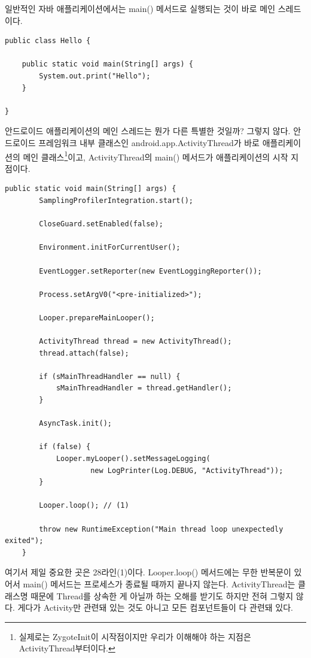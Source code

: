 일반적인 자바 애플리케이션에서는 main() 메서드로 실행되는 것이 바로 메인 스레드이다.
\begin{lstlisting}[frame=single] 
public class Hello {

	public static void main(String[] args) {
		System.out.print("Hello");
	}

}
\end{lstlisting}

안드로이드 애플리케이션의 메인 스레드는 뭔가 다른 특별한 것일까? 그렇지 않다. 
안드로이드 프레임워크 내부 클래스인 android.app.ActivityThread가 바로 애플리케이션의 메인 클래스\footnote{실제로는 ZygoteInit이 시작점이지만 우리가 이해해야 하는 지점은 ActivityThread부터이다.}이고, ActivityThread의 main() 메서드가 애플리케이션의 시작 지점이다.\newpage

\begin{lstlisting}[frame=single, caption=ActivityThread.java] 
	public static void main(String[] args) {
		SamplingProfilerIntegration.start();

		CloseGuard.setEnabled(false);

		Environment.initForCurrentUser();

		EventLogger.setReporter(new EventLoggingReporter());

		Process.setArgV0("<pre-initialized>");

		Looper.prepareMainLooper();

		ActivityThread thread = new ActivityThread();
		thread.attach(false);

		if (sMainThreadHandler == null) {
			sMainThreadHandler = thread.getHandler();
		}

		AsyncTask.init();

		if (false) {
			Looper.myLooper().setMessageLogging(
					new LogPrinter(Log.DEBUG, "ActivityThread"));
		}

		Looper.loop(); // (1)

		throw new RuntimeException("Main thread loop unexpectedly exited");
	}
\end{lstlisting}

여기서 제일 중요한 곳은 28라인(1)이다. 
Looper.loop() 메서드에는 무한 반복문이 있어서 main() 메서드는 프로세스가 종료될 때까지 끝나지 않는다.
ActivityThread는 클래스명 때문에 Thread를 상속한 게 아닐까 하는 오해를 받기도 하지만 전혀 그렇지 않다.
게다가 Activity만 관련돼 있는 것도 아니고 모든 컴포넌트들이 다 관련돼 있다.


